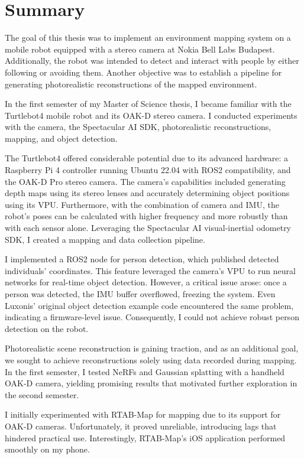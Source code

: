 \chapter{Summary} \label{summary}

The goal of this thesis was to implement an environment mapping system on a mobile robot equipped with a stereo camera at Nokia Bell Labs Budapest. Additionally, the robot was intended to detect and interact with people by either following or avoiding them. Another objective was to establish a pipeline for generating photorealistic reconstructions of the mapped environment.

In the first semester of my Master of Science thesis, I became familiar with the Turtlebot4 mobile robot and its OAK-D stereo camera. I conducted experiments with the camera, the Spectacular AI SDK, photorealistic reconstructions, mapping, and object detection.

The Turtlebot4 offered considerable potential due to its advanced hardware: a Raspberry Pi 4 controller running Ubuntu 22.04 with ROS2 compatibility, and the OAK-D Pro stereo camera. The camera's capabilities included generating depth maps using its stereo lenses and accurately determining object positions using its VPU. Furthermore, with the combination of camera and IMU, the robot's poses can be calculated with higher frequency and more robustly than with each sensor alone. Leveraging the Spectacular AI visual-inertial odometry SDK, I created a mapping and data collection pipeline.

I implemented a ROS2 node for person detection, which published detected individuals' coordinates. This feature leveraged the camera's VPU to run neural networks for real-time object detection. However, a critical issue arose: once a person was detected, the IMU buffer overflowed, freezing the system. Even Luxonis’ original object detection example code encountered the same problem, indicating a firmware-level issue. Consequently, I could not achieve robust person detection on the robot.

Photorealistic scene reconstruction is gaining traction, and as an additional goal, we sought to achieve reconstructions solely using data recorded during mapping. In the first semester, I tested NeRFs and Gaussian splatting with a handheld OAK-D camera, yielding promising results that motivated further exploration in the second semester.

I initially experimented with RTAB-Map for mapping due to its support for OAK-D cameras. Unfortunately, it proved unreliable, introducing lags that hindered practical use. Interestingly, RTAB-Map's iOS application performed smoothly on my phone.

